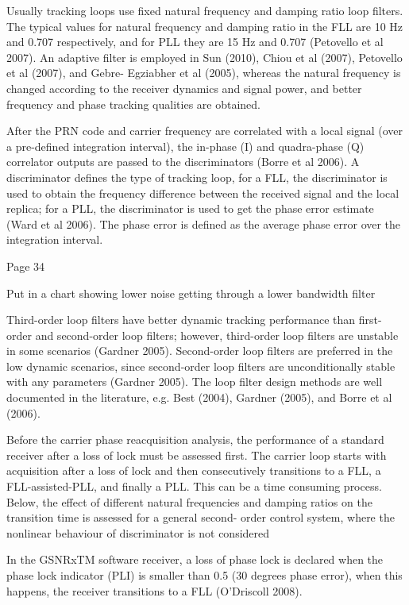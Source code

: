 Usually tracking loops use fixed natural frequency and damping ratio loop filters. The typical values for natural frequency and damping ratio in the FLL are 10 Hz and 0.707 respectively, and for PLL they are 15 Hz and 0.707 (Petovello et al 2007). An adaptive filter is employed in Sun (2010), Chiou et al (2007), Petovello et al (2007), and Gebre- Egziabher et al (2005), whereas the natural frequency is changed according to the receiver dynamics and signal power, and better frequency and phase tracking qualities are obtained.


After the PRN code and carrier frequency are correlated with a local signal (over a pre-defined integration interval), the in-phase (I) and quadra-phase (Q) correlator outputs are passed to the discriminators (Borre et al 2006). A discriminator defines the type of tracking loop, for a FLL, the discriminator is used to obtain the frequency difference between the received signal and the local replica; for a PLL, the discriminator is used to get the phase error estimate (Ward et al 2006). The phase error is defined as the average phase error over the integration interval.

Page 34 

Put in a chart showing lower noise getting through a lower bandwidth filter

Third-order loop filters have better dynamic tracking performance than first-order and second-order loop filters; however, third-order loop filters are unstable in some scenarios (Gardner 2005). Second-order loop filters are preferred in the low dynamic scenarios, since second-order loop filters are unconditionally stable with any parameters (Gardner 2005). The loop filter design methods are well documented in the literature, e.g. Best
(2004), Gardner (2005), and Borre et al (2006).

Before the carrier phase reacquisition analysis, the performance of a standard receiver after a loss of lock must be assessed first. The carrier loop starts with acquisition after a loss of lock and then consecutively transitions to a FLL, a FLL-assisted-PLL, and finally a PLL. This can be a time consuming process. Below, the effect of different natural frequencies and damping ratios on the transition time is assessed for a general second- order control system, where the nonlinear behaviour of discriminator is not considered

In the GSNRxTM software receiver, a loss of phase lock is declared when the phase lock indicator (PLI) is smaller than 0.5 (30 degrees phase error), when this happens, the receiver transitions to a FLL (O'Driscoll 2008).

